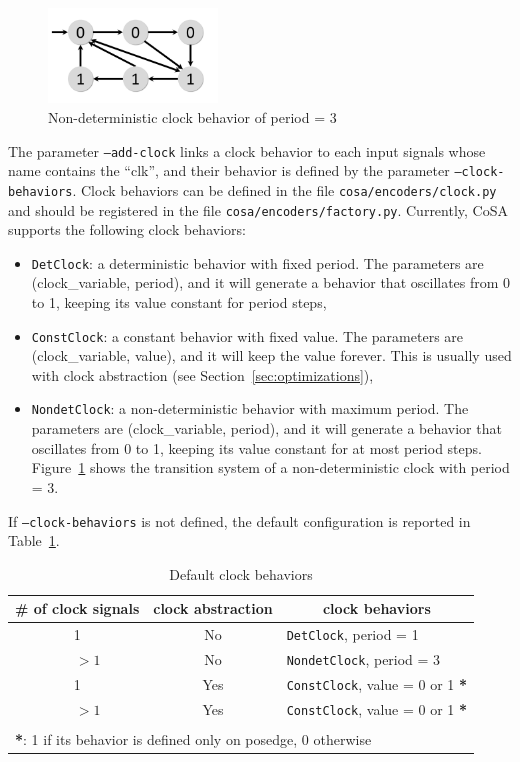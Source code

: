 \documentclass{article}
\theoremstyle{definition}
\begin{document}
\begin{figure}[ht]
  \centering
    \includegraphics[width=0.4\textwidth]{img/NonDetClock.pdf}
    \caption{Non-deterministic clock behavior of period = 3}
    \label{fig:nondet_clock}
\end{figure}

The parameter \texttt{--add-clock} links a clock behavior to each
input signals whose name contains the ``clk'', and their behavior is
defined by the parameter \texttt{--clock-behaviors}. Clock behaviors
can be defined in the file \texttt{cosa/encoders/clock.py} and should
be registered in the file
\texttt{cosa/encoders/factory.py}. Currently, CoSA supports the
following clock behaviors:

\begin{itemize}
\item \texttt{DetClock}: a deterministic behavior with fixed
  period. The parameters are (clock\_variable, period), and it will
  generate a behavior that oscillates from 0 to 1, keeping its value
  constant for period steps,
\item \texttt{ConstClock}: a constant behavior with fixed value. The
  parameters are (clock\_variable, value), and it will keep the value
  forever. This is usually used with clock abstraction (see
  Section~\ref{sec:optimizations}),
\item \texttt{NondetClock}: a non-deterministic behavior with maximum
  period. The parameters are (clock\_variable, period), and it will
  generate a behavior that oscillates from 0 to 1, keeping its value
  constant for at most period steps. Figure~\ref{fig:nondet_clock}
  shows the transition system of a non-deterministic clock with period
  = 3.
\end{itemize}

If \texttt{--clock-behaviors} is not defined, the default
configuration is reported in Table~\ref{tab:clock_default}.

\begin{table}[h]
  \centering
\begin{tabular}{ c c | l }
  \# of clock signals & clock abstraction & \multicolumn{1}{c}{clock behaviors} \\ \hline 
  1 & No & \texttt{DetClock}, period = 1 \\
  ~~~$>1$ & No & \texttt{NondetClock}, period = 3  \\
  1 & Yes & \texttt{ConstClock}, value = 0 or 1 \textbf{*}\\
  ~~~$>1$ & Yes & \texttt{ConstClock}, value = 0 or 1 \textbf{*} \\
  \\
  \multicolumn{3}{l}{\textbf{*}: 1 if its behavior is defined only on posedge, 0 otherwise}
\end{tabular}
\caption{Default clock behaviors}
\label{tab:clock_default}
\end{table}
\end{document}
